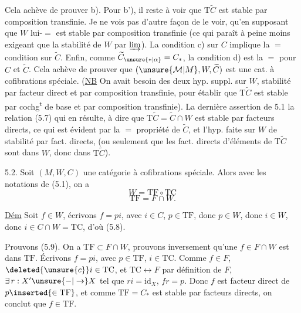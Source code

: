 
Cela achève de prouver b). Pour b'), il reste à voir que $\mathrm T\widetilde C$ est stable par composition transfinie. Je ne vois pas d'autre façon de le voir, qu'en supposant que $W$ lui-$=$ est stable par composition transfinie (ce qui paraît à peine moins exigeant que la stabilité de $W$ par $\varinjlim$).  La condition c) sur $C$  implique la $=$ condition sur $\widetilde C$. Enfin, comme $\widetilde C_{\unsure{*|\alpha}}=C_*$, la condition d) est la $=$ pour $C$ et $\widetilde C$. Cela achève de prouver que $(\unsure{\mathcal M|M},W,\widetilde C)$ est une cat. à cofibrations spéciale. (\uline{NB} On avait besoin des  deux hyp. suppl. sur $W$, stabilité par facteur direct et par composition transfinie, pour établir que $\mathrm T\widetilde C$ est stable par cochg\textsuperscript{t} de base et par composition transfinie). La dernière assertion de 5.1  la relation (5.7) qui en résulte,  à dire que $\mathrm T\widetilde C=\widetilde C\cap W$ est stable par facteurs directs, ce qui est évident par la $=$  propriété de $\widetilde C$, et l'hyp. faite sur $W$ de  stabilité par fact. directs, (ou seulement que les fact. directs d'éléments de $\mathrm T\widetilde C$ sont dans $W$, donc dans $\mathrm T\widetilde C$).

\uline{} 5.2. Soit $(M,W,C)$ une catégorie à cofibrations spéciale.  Alors avec les notations de (5.1), on a
\[
 W=\mathrm{TF}\circ\mathrm{TC} \tag*{(5.8)}
\]
\[
 \mathrm{TF}=F\cap W. \tag*{(5.9)}
\]

\uline{Dém} Soit $f\in W$, écrivons $f=pi$, avec $i\in C$, $p\in\mathrm{TF}$, donc $p\in W$, donc $i\in W$, donc $i\in C\cap W=\mathrm{TC}$, d'où (5.8).

Prouvons (5.9). On a $\mathrm{TF}\subset F\cap W$, prouvons inversement qu'une $f\in F\cap W$ est dans $\mathrm{TF}$.
Écrivons $f=pi$, avec $p\in\mathrm{TF}$, $i\in\mathrm{TC}$. Comme $f\in F$, $\deleted{\unsure{c}}i\in\mathrm{TC}$, et $\mathrm{TC}\longleftrightarrow F$ par définition de $F$, $\exists\,r:X'\unsure{\mathbin{-}|\to}X$ tel que $ri=\mathrm{id}_X$, $fr=p$. Donc $f$ est facteur direct de $p\inserted{\in\mathrm{TF}}$, et comme $\mathrm{TF}=C_*$  est stable par facteurs directs, on conclut que $f\in\mathrm{TF}$.

